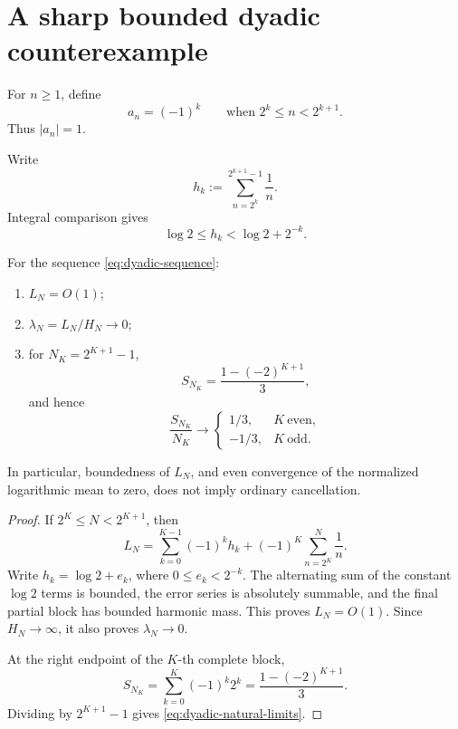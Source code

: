 \section{A sharp bounded dyadic counterexample}
\label{sec:dyadic-counterexample}

\begin{definition}
\label{def:dyadic-sequence}
For \(n\ge1\), define
\begin{equation}
 a_n=(-1)^k\qquad\text{when }2^k\le n<2^{k+1}.
\label{eq:dyadic-sequence}
\end{equation}
Thus \(|a_n|=1\).
\end{definition}

Write
\begin{equation}
 h_k:=\sum_{n=2^k}^{2^{k+1}-1}\frac1n.
\label{eq:dyadic-harmonic-mass}
\end{equation}
Integral comparison gives
\begin{equation}
 \log2\le h_k<\log2+2^{-k}.
\label{eq:dyadic-harmonic-estimate}
\end{equation}

\begin{theorem}
\label{thm:dyadic-counterexample}
For the sequence \eqref{eq:dyadic-sequence}:
\begin{enumerate}[label=\textup{(\roman*)},leftmargin=2.5em]
 \item \(L_N=O(1)\);
 \item \(\lambda_N=L_N/H_N\to0\);
 \item for \(N_K=2^{K+1}-1\),
 \begin{equation}
  S_{N_K}=\frac{1-(-2)^{K+1}}3,
 \label{eq:dyadic-natural-sum}
 \end{equation}
 and hence
 \begin{equation}
  \frac{S_{N_K}}{N_K}\longrightarrow
  \begin{cases}
   1/3,&K\ \text{even},\\
   -1/3,&K\ \text{odd}.
  \end{cases}
 \label{eq:dyadic-natural-limits}
 \end{equation}
\end{enumerate}
In particular, boundedness of \(L_N\), and even convergence of the
normalized logarithmic mean to zero, does not imply ordinary
cancellation.
\end{theorem}

\begin{proof}
If \(2^K\le N<2^{K+1}\), then
\[
 L_N=
 \sum_{k=0}^{K-1}(-1)^kh_k
 +(-1)^K\sum_{n=2^K}^{N}\frac1n.
\]
Write \(h_k=\log2+e_k\), where
\(0\le e_k<2^{-k}\).  The alternating sum of the constant
\(\log2\) terms is bounded, the error series is absolutely
summable, and the final partial block has bounded harmonic mass.
This proves \(L_N=O(1)\).  Since \(H_N\to\infty\), it also proves
\(\lambda_N\to0\).

At the right endpoint of the \(K\)-th complete block,
\[
 S_{N_K}=\sum_{k=0}^K(-1)^k2^k
 =\frac{1-(-2)^{K+1}}3.
\]
Dividing by \(2^{K+1}-1\) gives
\eqref{eq:dyadic-natural-limits}.
\end{proof}

